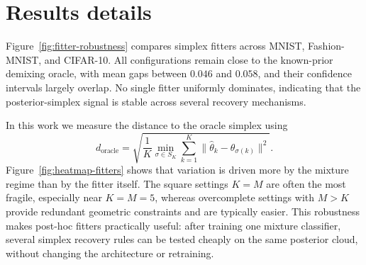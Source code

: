 \documentclass{article}
\theoremstyle{plain}
\theoremstyle{definition}
\theoremstyle{remark}
\begin{document}
% 
\section{Results details }
Figure~\ref{fig:fitter-robustness} compares simplex fitters across MNIST, Fashion-MNIST, and CIFAR-10.
All configurations remain close to the known-prior demixing oracle, with mean gaps between $0.046$ and $0.058$, and their confidence intervals largely overlap.
No single fitter uniformly dominates, indicating that the posterior-simplex signal is stable across several recovery mechanisms.

In this work we measure the distance to the oracle simplex using 
\begin{equation*}
    d_{\text{oracle}} = \sqrt{\frac{1}{K}\min_{\sigma \in S_K} \sum_{k=1}^{K} \|\hat{\theta}_k - \theta_{\sigma(k)}\|^2}.
\end{equation*} Figure~\ref{fig:heatmap-fitters} shows that variation is driven more by the mixture regime than by the fitter itself.
The square settings $K=M$ are often the most fragile, especially near $K=M=5$, whereas overcomplete settings with $M>K$ provide redundant geometric constraints and are typically easier.
This robustness makes post-hoc fitters practically useful: after training one mixture classifier, several simplex recovery rules can be tested cheaply on the same posterior cloud, without changing the architecture or retraining.
\end{document}
